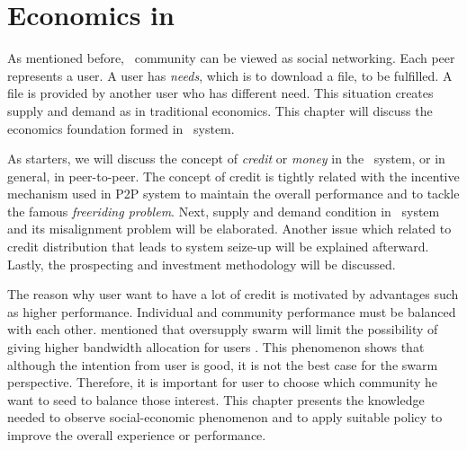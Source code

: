 \chapter{Economics in \bt}

As mentioned before, \bt~community can be viewed as social networking. Each peer represents a user. A user has \textit{needs}, which is to download a file, to be fulfilled. A file is provided by another user who has different need. This situation creates supply and demand as in traditional economics. This chapter will discuss the economics foundation formed in \bt~system.

As starters, we will discuss the concept of \textit{credit} or \textit{money} in the \bt~system, or in general, in peer-to-peer. The concept of credit is tightly related with the incentive mechanism used in P2P system to maintain the overall performance and to tackle the famous \textit{freeriding problem}. Next, supply and demand condition in \bt~system and its misalignment problem will be elaborated. Another issue which related to credit distribution that leads to system seize-up will be explained afterward. Lastly, the prospecting and investment methodology will be discussed.

The reason why user want to have a lot of credit is motivated by advantages such as higher performance. Individual and community performance must be balanced with each other. \citeauthor{2013:survivepriv:jia} mentioned that oversupply swarm will limit the possibility of giving higher bandwidth allocation for users \cite{2013:survivepriv:jia}. This phenomenon shows that although the intention from user is good, it is not the best case for the swarm perspective. Therefore, it is important for user to choose which community he want to seed to balance those interest. This chapter presents the knowledge needed to observe social-economic phenomenon and to apply suitable policy to improve the overall experience or performance.




